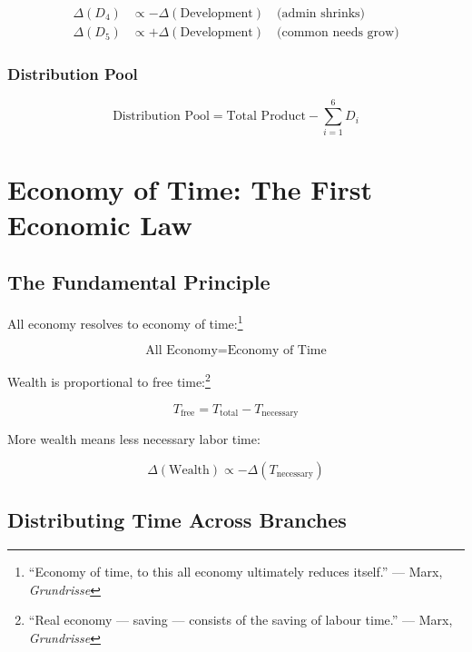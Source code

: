 \documentclass[12pt,a4paper]{article}
\begin{document}
\begin{align}
\Delta(D_4) &\propto -\Delta(\text{Development}) \quad \text{(admin shrinks)} \\
\Delta(D_5) &\propto +\Delta(\text{Development}) \quad \text{(common needs grow)}
\end{align}

\subsubsection{Distribution Pool}

\begin{equation}
\text{Distribution Pool} = \text{Total Product} - \sum_{i=1}^{6} D_i
\end{equation}

\section{Economy of Time: The First Economic Law}

\subsection{The Fundamental Principle}

All economy resolves to economy of time:\footnote{``Economy of time, to this all economy ultimately reduces itself.'' --- Marx, \textit{Grundrisse}}

\begin{equation}
\boxed{\text{All Economy} = \text{Economy of Time}}
\end{equation}

Wealth is proportional to free time:\footnote{``Real economy — saving — consists of the saving of labour time.'' --- Marx, \textit{Grundrisse}}

\begin{equation}
T_{\text{free}} = T_{\text{total}} - T_{\text{necessary}}
\end{equation}

More wealth means less necessary labor time:

\begin{equation}
\Delta(\text{Wealth}) \propto -\Delta(T_{\text{necessary}})
\end{equation}

\subsection{Distributing Time Across Branches}
\end{document}
